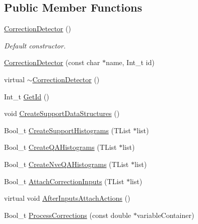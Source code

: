\subsection*{Public Member Functions}
\begin{DoxyCompactItemize}
\item 
\mbox{\label{classQn_1_1CorrectionDetector_a58413afb9c1be0e4ddf602aa351fe00f}} 
\mbox{\hyperlink{classQn_1_1CorrectionDetector_a58413afb9c1be0e4ddf602aa351fe00f}{Correction\+Detector}} ()
\begin{DoxyCompactList}\small\item\em Default constructor. \end{DoxyCompactList}\item 
\mbox{\hyperlink{classQn_1_1CorrectionDetector_a50aa008a5c92d7773d8b9851806ddb19}{Correction\+Detector}} (const char $\ast$name, Int\+\_\+t id)
\item 
virtual \mbox{\hyperlink{classQn_1_1CorrectionDetector_a90e172fc836adae967b808cb75be3ca3}{$\sim$\+Correction\+Detector}} ()
\item 
Int\+\_\+t \mbox{\hyperlink{classQn_1_1CorrectionDetector_a8f3d562c17ea64048e7830683387588c}{Get\+Id}} ()
\item 
void \mbox{\hyperlink{classQn_1_1CorrectionDetector_a7858076955dbbffabbe3092f9936f51a}{Create\+Support\+Data\+Structures}} ()
\item 
Bool\+\_\+t \mbox{\hyperlink{classQn_1_1CorrectionDetector_a401cd8059027ee1f06eb96de414edc0c}{Create\+Support\+Histograms}} (T\+List $\ast$list)
\item 
Bool\+\_\+t \mbox{\hyperlink{classQn_1_1CorrectionDetector_a3670d14b0e6fc446631c87dc5bb0d12b}{Create\+Q\+A\+Histograms}} (T\+List $\ast$list)
\item 
Bool\+\_\+t \mbox{\hyperlink{classQn_1_1CorrectionDetector_a24c31acbd10eaf982a10b304390de47c}{Create\+Nve\+Q\+A\+Histograms}} (T\+List $\ast$list)
\item 
Bool\+\_\+t \mbox{\hyperlink{classQn_1_1CorrectionDetector_a9348902c90054c1f1d262081c2818b2e}{Attach\+Correction\+Inputs}} (T\+List $\ast$list)
\item 
virtual void \mbox{\hyperlink{classQn_1_1CorrectionDetector_a9cd7dd2c1a6d5d8cb7a1a0a18f3f5ee3}{After\+Inputs\+Attach\+Actions}} ()
\item 
Bool\+\_\+t \mbox{\hyperlink{classQn_1_1CorrectionDetector_a4942a3b1f05f8a7f4d899e6ae9808338}{Process\+Corrections}} (const double $\ast$variable\+Container)

\end{DoxyCompactItemize}
